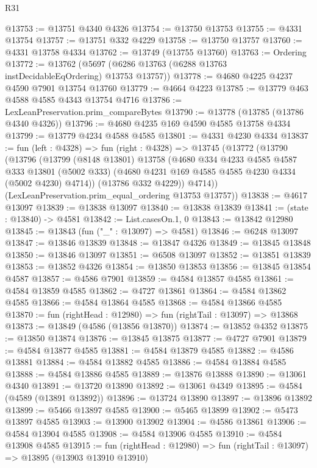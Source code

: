 \begin{lexlean}{R31}
\begin{coremodule}
@13753 := @13751 @4340 @4326
@13754 := @13750 @13753
@13755 := @4331 @13754
@13757 := @13751 @332 @4229
@13758 := @13750 @13757
@13760 := @4331 @13758 @4334
@13762 := @13749 (@13755 @13760)
@13763 := Ordering
@13772 := @13762 (@5697 (@6286 @13763 (@6288 @13763 instDecidableEqOrdering) @13753 @13757))
@13778 := @4680 @4225 @4237 @4590 @7901 @13754 @13760
@13779 := @4664 @4223
@13785 := @13779 @463 @4588 @4585 @4343 @13754 @4716
@13786 := LexLeanPreservation.prim_compareBytes
@13790 := @13778 (@13785 (@13786 @4340 @4326))
@13796 := @4680 @4235 @169 @4590 @4585 @13758 @4334
@13799 := @13779 @4234 @4588 @4585
@13801 := @4331 @4230 @4334
@13837 := fun (left : @4328) =>
  fun (right : @4328) =>
  @13745
    (@13772
      (@13790
        (@13796
          (@13799
            (@8148 @13801)
            @13758
            (@4680
              @334
              @4233
              @4585
              @4587
              @333
              @13801
              (@5002 @333)
              (@4680 @4231 @169 @4585 @4585 @4230 @4334 (@5002 @4230) @4714))
            (@13786 @332 @4229))
          @4714))
      (LexLeanPreservation.prim_equal_ordering @13753 @13757))
@13838 := @4617 @13097
@13839 := @13838 @13097
@13840 := @13838 @13839
@13841 := (state : @13840) -> @4581
@13842 := List.casesOn.{1, 0}
@13843 := @13842 @12980
@13845 := @13843 (fun ("_" : @13097) => @4581)
@13846 := @6248 @13097
@13847 := @13846 @13839
@13848 := @13847 @4326
@13849 := @13845 @13848
@13850 := @13846 @13097
@13851 := @6508 @13097
@13852 := @13851 @13839
@13853 := @13852 @4326
@13854 := @13850 @13853
@13856 := @13845 @13854 @4587
@13857 := @4586 @7901
@13859 := @4584 @13857 @4585
@13861 := @4584 @13859 @4585
@13862 := @4727 @13861
@13864 := @4584 @13862 @4585
@13866 := @4584 @13864 @4585
@13868 := @4584 @13866 @4585
@13870 := fun (rightHead : @12980) => fun (rightTail : @13097) => @13868
@13873 := @13849 (@4586 (@13856 @13870))
@13874 := @13852 @4352
@13875 := @13850 @13874
@13876 := @13845 @13875
@13877 := @4727 @7901
@13879 := @4584 @13877 @4585
@13881 := @4584 @13879 @4585
@13882 := @4586 @13881
@13884 := @4584 @13882 @4585
@13886 := @4584 @13884 @4585
@13888 := @4584 @13886 @4585
@13889 := @13876 @13888
@13890 := @13061 @4340
@13891 := @13720 @13890
@13892 := @13061 @4349
@13895 := @4584 (@4589 (@13891 @13892))
@13896 := @13724 @13890
@13897 := @13896 @13892
@13899 := @5466 @13897 @4585
@13900 := @5465 @13899
@13902 := @5473 @13897 @4585
@13903 := @13900 @13902
@13904 := @4586 @13861
@13906 := @4584 @13904 @4585
@13908 := @4584 @13906 @4585
@13910 := @4584 @13908 @4585
@13915 := fun (rightHead : @12980) => fun (rightTail : @13097) => @13895 (@13903 @13910 @13910)

\end{coremodule}
\end{lexlean}
